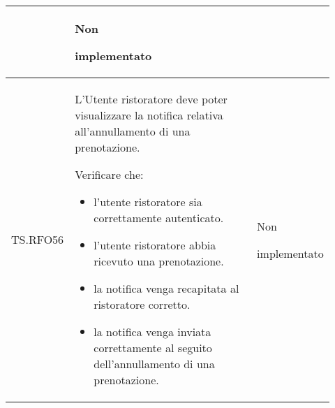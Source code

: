 \begin{longtable}{|p{0.10\linewidth}|p{0.70\linewidth}|p{0.12\linewidth}|}
\begin{itemize}
    \end{itemize}&
    Non \par implementato  \\
    \hline
    TS.RFO56 & 
    L’Utente ristoratore deve poter visualizzare la notifica relativa all’annullamento di una prenotazione. \par 
    Verificare che: 
    \begin{itemize}
        \item l'utente ristoratore sia correttamente autenticato.
        \item l'utente ristoratore abbia ricevuto una prenotazione.
        \item la notifica venga recapitata al ristoratore corretto.
        \item la notifica venga inviata correttamente al seguito dell'annullamento di una prenotazione. 
    \end{itemize}&
    Non \par implementato  \\
    \hline
\end{longtable}



